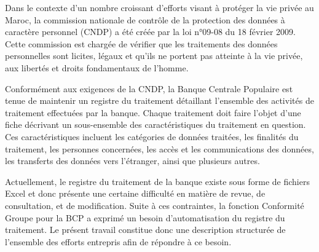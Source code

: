 \begin{introductiongenerale}

    \vspace{.5cm}

    Dans le contexte d’un nombre croissant d’efforts visant à protéger la vie privée au Maroc, la commission nationale de contrôle de la protection des données à caractère personnel (CNDP) a été créée par la loi n°09-08 du 18 février 2009. Cette commission est chargée de vérifier que les traitements des données personnelles sont licites, légaux et qu’ils ne portent pas atteinte à la vie privée, aux libertés et droits fondamentaux de l’homme. 
    \newline

    \noindent Conformément aux exigences de la CNDP, la Banque Centrale Populaire est tenue de maintenir un registre du traitement détaillant l’ensemble des activités de traitement effectuées par la banque. Chaque traitement doit faire l’objet d’une fiche décrivant un sous-ensemble des caractéristiques du traitement en question. Ces caractéristiques incluent les catégories de données traitées, les finalités du traitement, les personnes concernées, les accès et les communications des données, les transferts des données vers l’étranger, ainsi que plusieurs autres.
    \newline

    \noindent Actuellement, le registre du traitement de la banque existe sous forme de fichiers Excel et donc présente une certaine difficulté en matière de revue, de consultation, et de modification. Suite à ces contraintes, la fonction Conformité Groupe pour la BCP a exprimé un besoin d’automatisation du registre du traitement. Le présent travail constitue donc une description structurée de l’ensemble des efforts entrepris afin de répondre à ce besoin. 
    
\end{introductiongenerale}